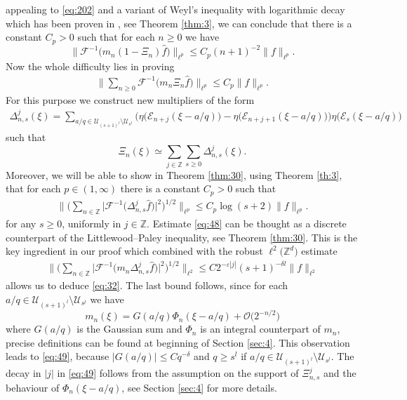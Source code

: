 \documentclass[a4paper,oneside]{amsart}
\theoremstyle{plain}
\theoremstyle{definition}
\numberwithin{equation}{section}
\newcounter{thm}
\theoremstyle{plain}
\newcommand{\ZZ}{\mathbb{Z}}
\newcommand{\calF}{\mathcal{F}}
\newcommand{\8}{\infty}
\begin{document}
appealing to \eqref{eq:202} and a variant of Weyl's inequality
with logarithmic decay which has been proven in \cite{mst1}, see Theorem
\ref{thm:3}, we can conclude that there is a constant $C_p>0$ such
that for each $n\ge0$ we have
\[
\big\|\calF^{-1}\big(m_{n}(1-\Xi_{n})\hat{f}\big)\big\|_{\ell^p}\le C_{
  p}(n+1)^{-2}\|f\|_{\ell^p}.
\]  
Now 
the whole difficulty  lies in proving 
\begin{align}
  \label{eq:32}
  \Big\|\sum_{n\ge0}\mathcal
F^{-1}\big(m_n\Xi_n\hat f\big)\Big\|_{\ell^p}\le C_p\|f\|_{\ell^p}.
\end{align}
For this purpose we  construct new multipliers of the form 
\begin{align}
\label{eq:47}
  \Delta_{n, s}^j(\xi)=\sum_{a/q\in\mathscr
    U_{(s+1)^l}\setminus\mathscr
    U_{s^l}}\big(\eta\big(\mathcal E_{n+j}(\xi-a/q)\big)-\eta\big(\mathcal E_{n+j+1}(\xi-a/q)\big)\big)\eta\big(\mathcal E_{s}(\xi-a/q)\big)
\end{align} 
such that
\[
\Xi_n(\xi)\simeq\sum_{j\in\ZZ}\sum_{s\ge0}\Delta_{n, s}^j(\xi).
\]
Moreover, we will be able to show in Theorem \ref{thm:30}, using Theorem \ref{th:3}, that for
each $p\in(1, \infty)$ there is a constant $C_p>0$ such that
\begin{align}
  \label{eq:48}
   \bigg\|\Big(\sum_{n\in\ZZ}\big|\mathcal
  F^{-1}\big(\Delta_{n,
    s}^j\hat{f}\big)\big|^2\Big)^{1/2}\bigg\|_{\ell^p}
	\le 
	C_p \log(s+2) \|f\|_{\ell^p}.
 \end{align}
 for any $s\ge0$, uniformly in $j\in\ZZ$. Estimate \eqref{eq:48} can
 be thought as a discrete counterpart of the Littlewood--Paley inequality,
 see Theorem \ref{thm:30}. This is the key ingredient in our proof
 which combined with the robust $\ell^2\big(\ZZ^d\big)$ estimate
\begin{align}
  \label{eq:49}
   \bigg\|\Big(\sum_{n\in\ZZ}\big|\mathcal
  F^{-1}\big(m_n\Delta_{n,
    s}^j\hat{f}\big)\big|^2\Big)^{1/2}\bigg\|_{\ell^2}
	\le 
	C2^{-\varepsilon|j|}(s+1)^{-\delta l} \|f\|_{\ell^2}
\end{align}
allows us to deduce \eqref{eq:32}. The last bound follows, since for
each $a/q\in\mathscr{U}_{(s+1)^l}\setminus \mathscr{U}_{s^l}$ we have
\[
m_{n}(\xi)=G(a/q)\Phi_{n}(\xi-a/q)+\mathcal O\big(2^{-n/2}\big)
\]
where $G(a/q)$ is the Gaussian sum and $\Phi_{n}$ is an integral
counterpart of $m_{n}$, precise definitions can be found at beginning
of Section \ref{sec:4}. This observation  leads to
\eqref{eq:49}, because $|G(a/q)|\le Cq^{-\delta}$ and
$q\ge s^l$ if $a/q\in\mathscr{U}_{(s+1)^l}\setminus
\mathscr{U}_{s^l}$. The decay in $|j|$ in \eqref{eq:49} follows from
the assumption on the support of $\Xi_{n, s}^j$ and the behaviour of
$\Phi_n(\xi-a/q)$, see Section \ref{sec:4} for more details. 
\end{document}
